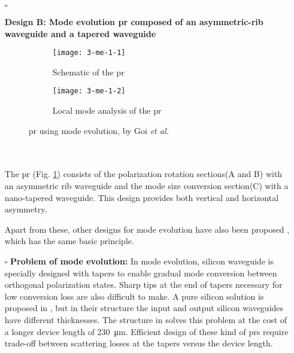 \documentclass[../report.tex]{subfiles}
\begin{document}
\begin{itemize}[leftmargin=*]
	\item[$\square$] \begin{minipage}[t]{\textwidth}\textbf{Design B: Mode evolution \gls{pr} composed of an asymmetric-rib waveguide and a tapered waveguide}
	\begin{figure}[H] %
		\begin{subfigure}[t]{0.45\textwidth}
			\texttt{[image: 3-me-1-1]}
			\caption{Schematic of the \gls{pr}}
			\label{fig:3_me_1_1}
		\end{subfigure}
		\hfill
		\begin{subfigure}[t]{0.45\textwidth}
			\texttt{[image: 3-me-1-2]}
			\caption{Local mode analysis of the \gls{pr}}
			\label{fig:3_me_1_2}
		\end{subfigure}
		\caption{\gls{pr} using mode evolution, by Goi \textit{et al.} \cite{kazuhiro_integrated_2015}}
	\end{figure}
	\end{minipage}\\\\
	\noindent The \gls{pr} (Fig. \ref{fig:3_me_1_1}) consists of the polarization rotation sections(A and B) with an asymmetric rib waveguide and the mode size conversion section(C) with a nano-tapered waveguide. This design provides both vertical and horizontal asymmetry. \par
	 
	Apart from these, other designs for mode evolution have also been proposed \cite{chen_compact_2011,zhang_efficient_2012,justin_conference_2012}, which has the same basic principle.
	
	\item[$\square$] \textbf{Problem of mode evolution:} In mode evolution, silicon waveguide is specially designed with tapers to enable gradual mode conversion between orthogonal polarization states. Sharp tips at the end of tapers necessary for low conversion loss are also difficult to make. A pure silicon solution is proposed in \cite{zhang_selected_2010}, but in their structure the input and output silicon waveguides have different thicknesses. The structure in \cite{kazuhiro_integrated_2015} solves this problem at the cost of a longer device length of \SI{230}{\micro\meter}. Efficient design of these kind of \gls{pr}s require trade-off between scattering losses at the tapers versus the device length.
\end{itemize}
\end{document}
